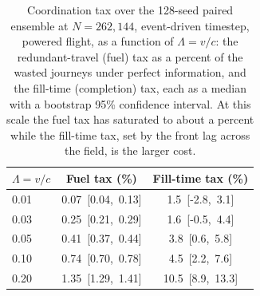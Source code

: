 \begin{table}[!t]
  \centering
  \caption{Coordination tax over the 128-seed paired ensemble at $N = 262{,}144$, event-driven
    timestep, powered flight, as a function of $\Lambda = v/c$: the redundant-travel (fuel) tax as a
    percent of the wasted journeys under perfect information, and the fill-time (completion) tax, each
    as a median with a bootstrap 95\% confidence interval. At this scale the fuel tax has saturated to
    about a percent while the fill-time tax, set by the front lag across the field, is the larger
    cost.}
  \label{tab:lambda}
  \begin{tabular}{lcc}
    \toprule
    $\Lambda = v/c$ & Fuel tax (\%) & Fill-time tax (\%) \\
    \midrule
    0.01 & \mbox{0.07 [0.04, 0.13]} & \mbox{1.5 [-2.8, 3.1]} \\
    0.03 & \mbox{0.25 [0.21, 0.29]} & \mbox{1.6 [-0.5, 4.4]} \\
    0.05 & \mbox{0.41 [0.37, 0.44]} & \mbox{3.8 [0.6, 5.8]} \\
    0.10 & \mbox{0.74 [0.70, 0.78]} & \mbox{4.5 [2.2, 7.6]} \\
    0.20 & \mbox{1.35 [1.29, 1.41]} & \mbox{10.5 [8.9, 13.3]} \\
    \bottomrule
  \end{tabular}
\end{table}

